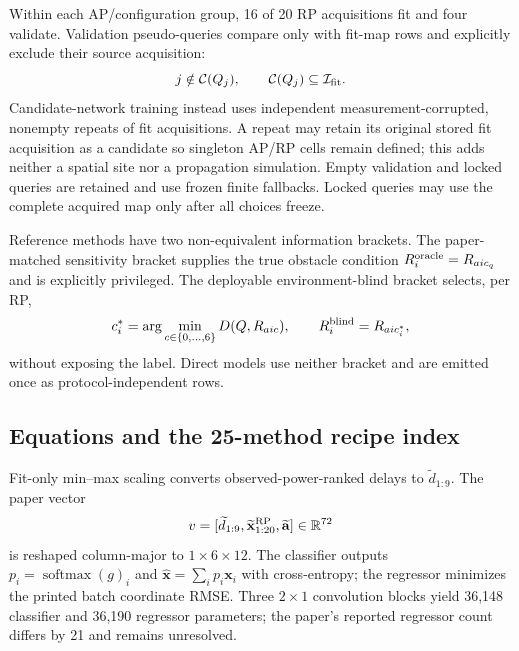 \documentclass[10pt]{article}
\newcommand{\R}{\mathbb R}
\begin{document}
Within each AP/configuration group, 16 of 20 RP acquisitions fit and four
validate.  Validation pseudo-queries compare only with fit-map rows and
explicitly exclude their source acquisition:
\begin{equation}
 j\notin\mathcal C(Q_j),\qquad \mathcal C(Q_j)\subseteq\mathcal I_{\rm fit}.
\end{equation}
Candidate-network training instead uses independent measurement-corrupted,
nonempty repeats of fit acquisitions.  A repeat may retain its original stored
fit acquisition as a candidate so singleton AP/RP cells remain defined; this
adds neither a spatial site nor a propagation simulation.  Empty validation and
locked queries are retained and use frozen finite fallbacks.  Locked queries may
use the complete acquired map only after all choices freeze.

Reference methods have two non-equivalent information brackets.  The
paper-matched sensitivity bracket supplies the true obstacle condition
$R_i^{\rm oracle}=R_{aic_q}$ and is explicitly privileged.  The deployable
environment-blind bracket selects, per RP,
\begin{equation}
 c_i^*=\arg\min_{c\in\{0,\ldots,6\}}D(Q,R_{aic}),\qquad
 R_i^{\rm blind}=R_{aic_i^*},
\end{equation}
without exposing the label.  Direct models use neither bracket and are emitted
once as protocol-independent rows.

\subsection{Equations and the 25-method recipe index}

Fit-only min--max scaling converts observed-power-ranked delays to
$\widetilde d_{1:9}$.  The paper vector
\begin{equation}
 v=[\widetilde d_{1:9},\widetilde{\mathbf x}_{1:20}^{\rm RP},
 \widetilde{\mathbf a}]\in\R^{72}
\end{equation}
is reshaped column-major to $1\times6\times12$.  The classifier outputs
$p_i=\operatorname{softmax}(g)_i$ and
$\widehat{\mathbf x}=\sum_i p_i\mathbf x_i$ with cross-entropy; the regressor
minimizes the printed batch coordinate RMSE.  Three $2\times1$ convolution
blocks yield 36,148 classifier and 36,190 regressor parameters; the paper's
reported regressor count differs by 21 and remains unresolved.
\end{document}
